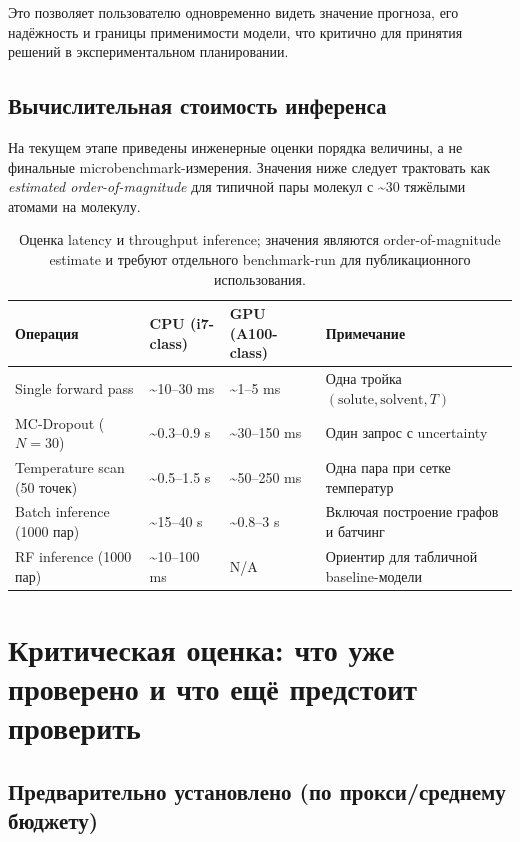 \documentclass[11pt]{article}
\begin{document}
Это позволяет пользователю одновременно видеть значение прогноза, его надёжность и границы применимости модели, что критично для принятия решений в экспериментальном планировании.

\subsection{Вычислительная стоимость инференса}

На текущем этапе приведены инженерные оценки порядка величины, а не финальные microbenchmark-измерения. Значения ниже следует трактовать как \textit{estimated order-of-magnitude} для типичной пары молекул с \textasciitilde30 тяжёлыми атомами на молекулу.

\begin{table}[H]
\centering
\begin{tabular}{|p{4.2cm}|p{3cm}|p{3cm}|p{4cm}|}
\hline
Операция & CPU (i7-class) & GPU (A100-class) & Примечание \\
\hline
Single forward pass & \textasciitilde10--30 ms & \textasciitilde1--5 ms & Одна тройка $(\mathrm{solute},\mathrm{solvent},T)$ \\
\hline
MC-Dropout ($N=30$) & \textasciitilde0.3--0.9 s & \textasciitilde30--150 ms & Один запрос с uncertainty \\
\hline
Temperature scan (50 точек) & \textasciitilde0.5--1.5 s & \textasciitilde50--250 ms & Одна пара при сетке температур \\
\hline
Batch inference (1000 пар) & \textasciitilde15--40 s & \textasciitilde0.8--3 s & Включая построение графов и батчинг \\
\hline
RF inference (1000 пар) & \textasciitilde10--100 ms & N/A & Ориентир для табличной baseline-модели \\
\hline
\end{tabular}
\caption{Оценка latency и throughput inference; значения являются order-of-magnitude estimate и требуют отдельного benchmark-run для публикационного использования.}
\end{table}

\section{Критическая оценка: что уже проверено и что ещё предстоит проверить}

\subsection{Предварительно установлено (по прокси/среднему бюджету)}
\end{document}
